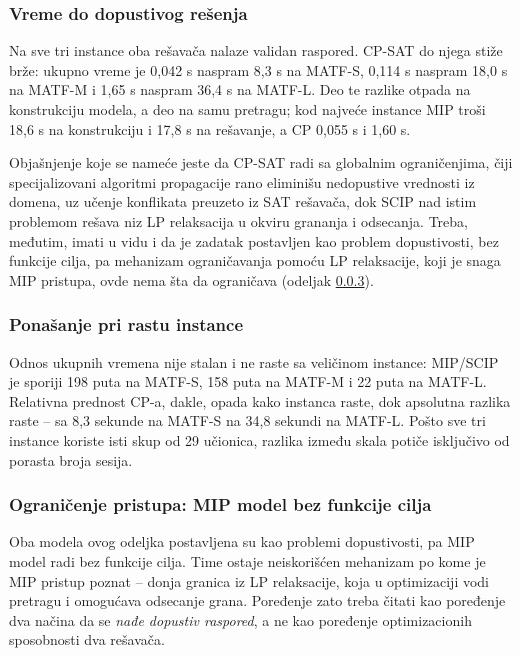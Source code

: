 \documentclass[12pt,oneside]{memoir}
\begin{document}
\subsubsection{Vreme do dopustivog rešenja}

Na sve tri instance oba rešavača nalaze validan raspored. CP-SAT do
njega stiže brže: ukupno vreme je 0,042 s naspram 8,3 s na MATF-S,
0,114 s naspram 18,0 s na MATF-M i 1,65 s naspram 36,4 s na MATF-L.
Deo te razlike otpada na konstrukciju modela, a deo na samu pretragu;
kod najveće instance MIP troši 18,6 s na konstrukciju i 17,8 s na
rešavanje, a CP 0,055 s i 1,60 s.

Objašnjenje koje se nameće jeste da CP-SAT radi sa globalnim
ograničenjima, čiji specijalizovani algoritmi propagacije rano
eliminišu nedopustive vrednosti iz domena, uz učenje konflikata
preuzeto iz SAT rešavača, dok SCIP nad istim problemom rešava niz LP
relaksacija u okviru grananja i odsecanja. Treba, međutim, imati u
vidu i da je zadatak postavljen kao problem dopustivosti, bez funkcije
cilja, pa mehanizam ograničavanja pomoću LP relaksacije, koji je
snaga MIP pristupa, ovde nema šta da ograničava (odeljak
\ref{sec:mip_bez_cilja}).

\subsubsection{Ponašanje pri rastu instance}

Odnos ukupnih vremena nije stalan i ne raste sa veličinom instance:
MIP/SCIP je sporiji 198 puta na MATF-S, 158 puta na MATF-M i 22 puta
na MATF-L. Relativna prednost CP-a, dakle, opada kako instanca raste,
dok apsolutna razlika raste -- sa 8,3 sekunde na MATF-S na 34,8
sekundi na MATF-L. Pošto sve tri instance koriste isti skup od 29
učionica, razlika između skala potiče isključivo od porasta broja
sesija.

\subsubsection{Ograničenje pristupa: MIP model bez funkcije cilja}
\label{sec:mip_bez_cilja}

Oba modela ovog odeljka postavljena su kao problemi dopustivosti, pa
MIP model radi bez funkcije cilja. Time ostaje neiskorišćen
mehanizam po kome je MIP pristup poznat -- donja granica iz LP
relaksacije, koja u optimizaciji vodi pretragu i omogućava odsecanje
grana. Poređenje zato treba čitati kao poređenje dva načina da se
\emph{nađe dopustiv raspored}, a ne kao poređenje optimizacionih
sposobnosti dva rešavača.
\end{document}

